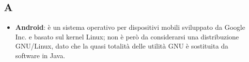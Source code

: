\subsection{A}
\begin{itemize}
	\item
	\textbf{Android}: è un sistema operativo per dispositivi mobili sviluppato da Google Inc. e basato sul kernel Linux; non è però da considerarsi una distribuzione GNU/Linux, dato che la quasi totalità delle utilità GNU è sostituita da software in Java.
\end{itemize}